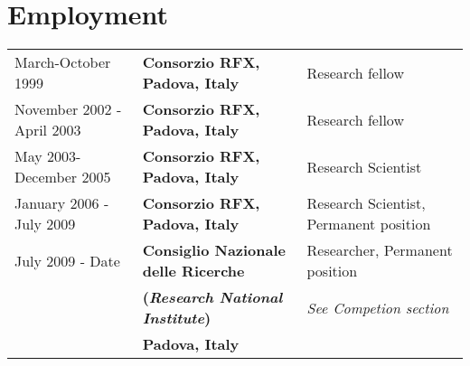
\section{Employment}
\begin{tabular}{lll}
March-October 1999 & \textbf{Consorzio RFX, Padova, Italy} & Research fellow \\
November 2002 - April 2003 & \textbf{Consorzio RFX, Padova, Italy} &
Research fellow \\
May 2003-December 2005 & \textbf{Consorzio RFX, Padova, Italy} &
Research Scientist \\ 
January 2006 - July 2009 & \textbf{Consorzio RFX, Padova, Italy} &
Research Scientist, Permanent position \\
July 2009 - Date & \textbf{Consiglio Nazionale delle Ricerche} &
Researcher, Permanent position \\
& \textbf{(\emph{Research National Institute})} & \emph{See Competion section}\\
& \textbf{Padova, Italy} & 
\end{tabular}
